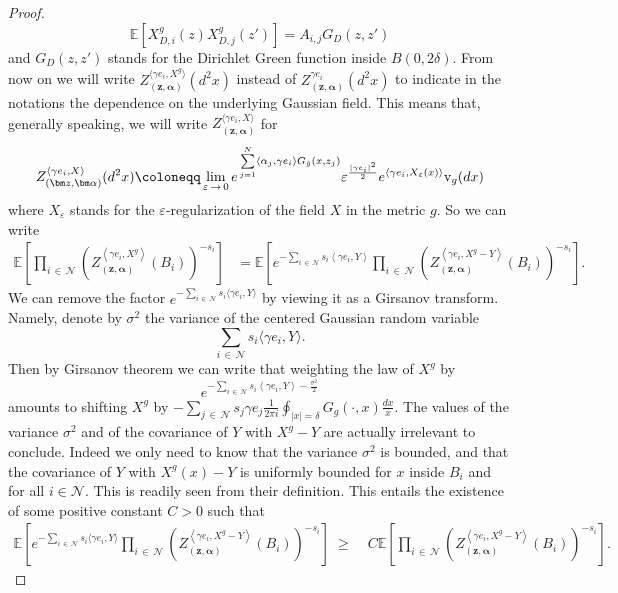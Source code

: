 \documentclass[AHL,Unicode,longabstracts,published]{cedram}
\renewcommand{\geq}{\;\geqslant\;}
\newcommand{\rmv}{\mathrm{v}}
\newcommand{\clN}{\mathcal{N}}
\newcommand{\E}{\mathbb{E}}
\newcommand*\eps{\varepsilon}
\let\oldhat\hat
\renewcommand*{\hat}[1]{\mathchoice{\widehat{#1}}{\widehat{#1}}{\oldhat{#1}}{\oldhat{#1}}}
\begin{document}
\begin{proof}
\begin{equation*}
\E\left[X^g_{D,i}(z) X^g_{D,j}(z')\right]=A_{i,j} G_D(z,z')
\end{equation*}
and $G_D(z,z')$ stands for the Dirichlet Green function inside $B(0,2\delta)$. From now on we will write $Z_{(\bm z,\bm \alpha)}^{\langle\gamma e_i,X^g\rangle} (d^2x)$ instead of $Z_{(\bm z,\bm \alpha)}^{\gamma e_i} (d^2x)$ to indicate in the notations the dependence on the underlying Gaussian field. This means that, generally speaking, we will write $Z_{(\bm z,\bm \alpha)}^{\langle\gamma e_i,X\rangle} $ for
\[
Z_{(\bm z,\bm \alpha)}^{\left\langle\gamma e_i,X\right\rangle} (d^2x)\coloneqq \lim_{\eps\,\to\,0}e^{\,\sum\limits_{j=1}^N \langle\alpha_j,\gamma e_i \rangle G_{\hat{g}} (x,z_j) } \eps^{ \frac{|\gamma e_i|^2}{2}} e^{ \langle\gamma e_i, X_\eps(x) \rangle} \rmv_g(dx)
\]
where $X_\eps$ stands for the $\eps$-regularization of the field $X$ in the metric $g$. So we can write
\begin{align*}
\E \left[\prod_{i\,\in\,\clN} \left(Z_{\left(\bm z,\bm \alpha\right)}^{\left\langle\gamma e_i,X^g\right\rangle} \left(B_i\right)\right)^{- s_i} \right] &= \E \left [e^{-\sum_{i\,\in\,\clN}s_i\left\langle\gamma e_i,Y\right\rangle} \prod_{i\,\in\,\clN} \left(Z_{\left(\bm z,\bm \alpha\right)}^{\left\langle\gamma e_i,X^g-Y\right\rangle}\left(B_i\right)\right)^{- s_i} \right].
\end{align*}
We can remove the factor $ e^{-\sum_{i\,\in\,\clN}s_i\langle\gamma e_i,Y\rangle}$ by viewing it as a Girsanov transform. Namely, denote by $\sigma^2$ the variance of the centered Gaussian random variable
\[
\sum_{i\,\in\,\clN}s_i\langle\gamma e_i,Y\rangle.
\]
Then by Girsanov theorem we can write that weighting the law of $X^g$ by
\[
e^{-\sum\limits_{i\,\in\,\clN}s_i\left\langle\gamma e_i,Y\right\rangle-\frac{\sigma^2}{2}}
\]
amounts to shifting $X^g$ by $-\sum_{j\,\in\,\clN}s_j\gamma e_j\frac{1}{2\pi i}\oint_{|x|=\delta}G_g(\cdot,x)\frac{dx}{x}$. The values of the variance $\sigma^2$ and of the covariance of $Y$ with $X^g-Y$ are actually irrelevant to conclude. Indeed we only need to know that the variance $\sigma ^2$ is bounded, and that the covariance of $Y$ with $X^g(x)-Y$ is uniformly bounded for $x$ inside $B_i$ and for all $i\in\clN$. This is readily seen from their definition. This entails the existence of some positive constant $C>0$ such that
\begin{align*}
\E \left[e^{-\sum\limits_{i\,\in\,\clN}s_i\langle\gamma e_i,Y\rangle} \prod_{i\,\in\,\clN} \left(Z_{\left(\bm z,\bm \alpha\right)}^{\left\langle\gamma e_i,X^g-Y\right\rangle} \left(B_i\right)\right)^{- s_i} \right] \geq & C \E \left[\prod_{i\,\in\,\clN} \left(Z_{\left(\bm z,\bm \alpha\right)}^{\left\langle\gamma e_i,X^g-Y\right\rangle} \left(B_i\right)\right)^{- s_i} \right].

\end{align*}
\end{proof}
\end{document}
